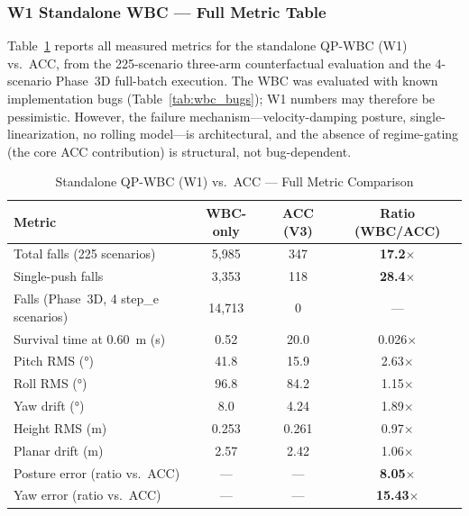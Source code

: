 \subsubsection{W1 Standalone WBC — Full Metric Table}

Table~\ref{tab:wbc_w1_full} reports all measured metrics for the standalone QP-WBC (W1) vs.\ ACC, from the 225-scenario three-arm counterfactual evaluation and the 4-scenario Phase~3D full-batch execution.
The WBC was evaluated with known implementation bugs (Table~\ref{tab:wbc_bugs}); W1 numbers may therefore be pessimistic.
However, the failure mechanism---velocity-damping posture, single-linearization, no rolling model---is architectural, and the absence of regime-gating (the core ACC contribution) is structural, not bug-dependent.

\begin{table}[h]
\centering
\caption{Standalone QP-WBC (W1) vs.\ ACC — Full Metric Comparison}
\label{tab:wbc_w1_full}
\footnotesize
\begin{tabular}{@{}lccc@{}}
\toprule
Metric & WBC-only & ACC (V3) & Ratio (WBC/ACC) \\
\midrule
Total falls (225 scenarios)                                  & 5{,}985   & 347   & \textbf{17.2}$\times$ \\
Single-push falls                                            & 3{,}353   & 118   & \textbf{28.4}$\times$ \\
Falls (Phase~3D, 4 step\_e scenarios)                        & 14{,}713  & 0     & --- \\
Survival time at \SI{0.60}{m} (s)                            & 0.52      & 20.0  & 0.026$\times$ \\
Pitch RMS (\si{\degree})                                     & 41.8      & 15.9  & 2.63$\times$ \\
Roll RMS (\si{\degree})                                      & 96.8      & 84.2  & 1.15$\times$ \\
Yaw drift (\si{\degree})                                     & 8.0       & 4.24  & 1.89$\times$ \\
Height RMS (m)                                               & 0.253     & 0.261 & 0.97$\times$ \\
Planar drift (m)                                             & 2.57      & 2.42  & 1.06$\times$ \\
Posture error (ratio vs.\ ACC)                               & ---       & ---   & \textbf{8.05}$\times$ \\
Yaw error (ratio vs.\ ACC)                                   & ---       & ---   & \textbf{15.43}$\times$ \\

\end{tabular}
\end{table}
